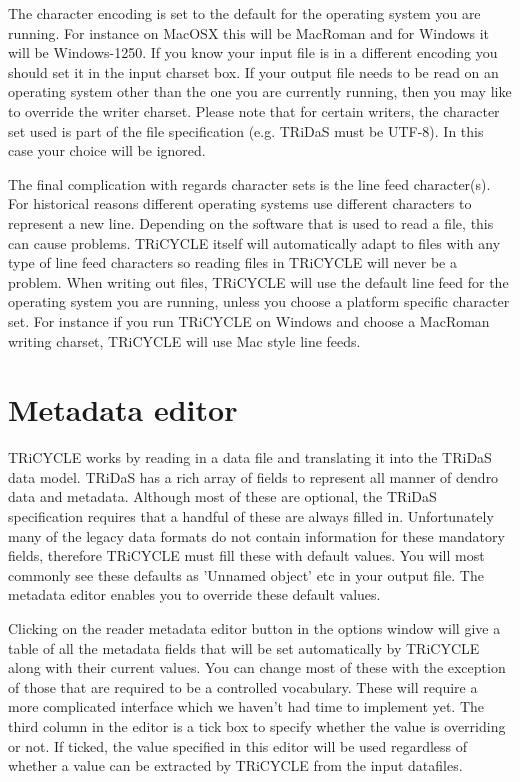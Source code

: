 \documentclass[10pt, headsepline,DIV14,BCOR0.5cm]{scrreprt}
\begin{document}
The character encoding is set to the default for the operating system you are running. For instance on
MacOSX this will be MacRoman and for Windows it will be Windows-1250. If you know your input file
is in a different encoding you should set it in the input charset box. If your output file needs to be read
on an operating system other than the one you are currently running, then you may like to override the
writer charset. Please note that for certain writers, the character set used is part of the file specification
(e.g. TRiDaS must be UTF-8). In this case your choice will be ignored.

The final complication with regards character sets is the line feed character(s). For historical reasons
different operating systems use different characters to represent a new line. Depending on the software
that is used to read a file, this can cause problems. TRiCYCLE itself will automatically adapt to files with
any type of line feed characters so reading files in TRiCYCLE will never be a problem. When writing
out files, TRiCYCLE will use the default line feed for the operating system you are running, unless you
choose a platform specific character set. For instance if you run TRiCYCLE on Windows and choose a
MacRoman writing charset, TRiCYCLE will use Mac style line feeds.


\section{Metadata editor}

TRiCYCLE works by reading in a data file and translating it into the TRiDaS data model. TRiDaS has
a rich array of fields to represent all manner of dendro data and metadata. Although most of these are
optional, the TRiDaS specification requires that a handful of these are always filled in. Unfortunately many
of the legacy data formats do not contain information for these mandatory fields, therefore TRiCYCLE
must fill these with default values. You will most commonly see these defaults as 'Unnamed object' etc in
your output file. The metadata editor enables you to override these default values.

Clicking on the reader metadata editor button in the options window will give a table of all the metadata
fields that will be set automatically by TRiCYCLE along with their current values. You can change most
of these with the exception of those that are required to be a controlled vocabulary. These will require a 
more complicated interface which we haven't had time to implement yet. The third column in the editor is
a tick box to specify whether the value is overriding or not. If ticked, the value specified in this editor will
be used regardless of whether a value can be extracted by TRiCYCLE from the input datafiles.
\end{document}
